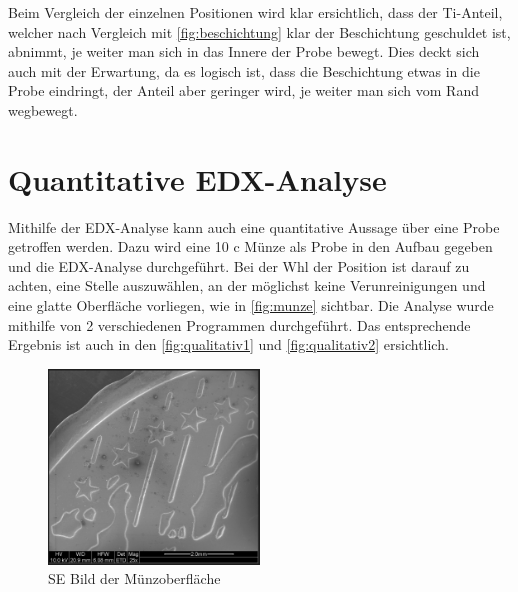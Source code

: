 \documentclass[12pt,english,ngerman]{scrartcl}
\begin{document}
Beim Vergleich der einzelnen Positionen wird klar ersichtlich, dass der
Ti-Anteil, welcher nach Vergleich mit \autoref{fig:beschichtung} klar der
Beschichtung geschuldet ist, abnimmt, je weiter man sich in das Innere der
Probe bewegt. Dies deckt sich auch mit der Erwartung, da es logisch ist, dass
die Beschichtung etwas in die Probe eindringt, der Anteil aber geringer wird,
je weiter man sich vom Rand wegbewegt.

\section{Quantitative EDX-Analyse}

Mithilfe der EDX-Analyse kann auch eine quantitative Aussage über eine Probe
getroffen werden. Dazu wird eine 10 c Münze als Probe in den Aufbau gegeben und
die EDX-Analyse durchgeführt. Bei der Whl der Position ist darauf zu achten,
eine Stelle auszuwählen, an der möglichst keine Verunreinigungen und eine
glatte Oberfläche vorliegen, wie in \autoref{fig:munze} sichtbar. Die Analyse
wurde mithilfe von 2 verschiedenen Programmen durchgeführt. Das entsprechende
Ergebnis ist auch in den \autoref{fig:qualitativ1} und
\autoref{fig:qualitativ2} ersichtlich.

\begin{figure}[H]
	\begin{center}
		\includegraphics[width =0.5\textwidth]{./figures/munze.png}
	\end{center}
	\caption{SE Bild der Münzoberfläche~\cite{zankel_rasterelektronenbild_nodate}
	}\label{fig:munze}
\end{figure}
\end{document}
